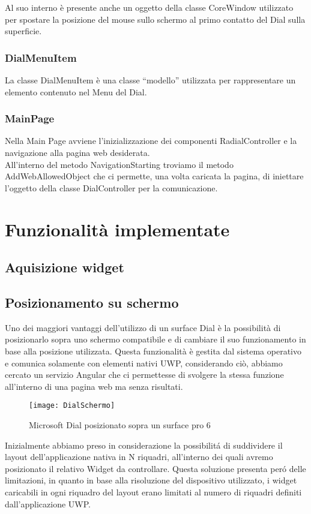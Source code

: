 Al suo interno è presente anche un oggetto della classe CoreWindow utilizzato per spostare la posizione del mouse sullo schermo al primo contatto del Dial sulla superficie.

\subsubsection{DialMenuItem}

La classe DialMenuItem è una classe “modello” utilizzata per rappresentare un elemento contenuto nel Menu del Dial.

\subsubsection{MainPage}

Nella Main Page avviene l’inizializzazione dei componenti RadialController e la navigazione alla pagina web desiderata.\\

All’interno del metodo NavigationStarting troviamo il metodo AddWebAllowedObject che ci permette, una volta caricata la pagina, di iniettare l’oggetto della classe DialController per la comunicazione.

\section{Funzionalità implementate}

\subsection{Aquisizione widget}
\subsection{Posizionamento su schermo}

Uno dei maggiori vantaggi dell’utilizzo di un surface Dial è la possibilità di posizionarlo sopra uno schermo compatibile e di cambiare il suo funzionamento in base alla posizione utilizzata.
Questa funzionalità è gestita dal sistema operativo e comunica solamente con elementi nativi UWP, considerando ciò, abbiamo cercato un servizio Angular che ci permettesse di svolgere la stessa funzione all’interno di una pagina web ma senza risultati.
\begin{figure}[htpb!]
  \centering
  \texttt{[image: DialSchermo]}
  \caption{Microsoft Dial posizionato sopra un surface pro 6}
\end{figure}
Inizialmente abbiamo preso in considerazione la possibilitá di suddividere il layout dell’applicazione nativa in N riquadri, all’interno dei quali avremo posizionato il relativo Widget da controllare. Questa soluzione presenta peró delle limitazioni, in quanto in base alla risoluzione del dispositivo utilizzato, i widget caricabili in ogni riquadro del layout erano limitati al numero di riquadri definiti dall’applicazione UWP.

